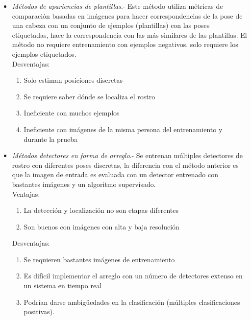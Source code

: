    \begin{itemize}
   	\item \textit{Métodos de apariencias de plantillas}.- Este método utiliza métricas de comparación basadas en imágenes para hacer correspondencias de la pose de una cabeza con un conjunto de ejemplos (plantillas) con las poses etiquetadas, hace la correspondencia con las más similares de las plantillas. El método no requiere entrenamiento con ejemplos negativos, solo requiere los ejemplos etiquetados.\\
   	Desventajas:
   	\begin{enumerate}[label=(\alph*)]
   		\item Solo estiman posiciones discretas
   		\item Se requiere saber dónde se localiza el rostro
   		\item Ineficiente con muchos ejemplos
   		\item Ineficiente con imágenes de la misma persona del entrenamiento y durante la prueba
   	\end{enumerate}
   	\item \textit{Métodos detectores en forma de arreglo}.- Se entrenan múltiples detectores de rostro con diferentes poses discretas, la diferencia con el método anterior es que la imagen de entrada es evaluada con un detector entrenado con bastantes imágenes y un algoritmo supervisado.
   	\\Ventajas:
   	\begin{enumerate}[label=(\alph*)]
   		\item La detección y localización no son etapas diferentes
   		\item Son buenos con imágenes con alta y baja resolución
   	\end{enumerate}
   	Desventajas:
   	\begin{enumerate}[label=(\alph*)]
   		\item Se requieren bastantes imágenes de entrenamiento
   		\item Es difícil implementar el arreglo con un número de detectores  extenso en un sistema en tiempo real
   		\item Podrían darse ambigüedades en la clasificación (múltiples clasificaciones positivas).
   	\end{enumerate}
   	

\end{itemize}
